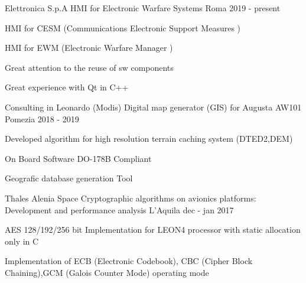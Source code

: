 


\begin{cventries}


\cventry
{Elettronica S.p.A} %
{HMI for Electronic Warfare Systems}%
{Roma} %
{2019 - present} %
{ %
	\begin{cvitems}
		\item { HMI for CESM (Communications Electronic Support Measures ) }
		\item { HMI for EWM (Electronic Warfare Manager ) }
		\item { Great attention to the reuse of sw components }
		\item { Great experience with Qt in C++ }
	\end{cvitems}
}


\cventry
{Consulting in Leonardo (Modis)} %
{Digital map generator (GIS) for Augusta AW101}%
{Pomezia} %
{2018 - 2019} %
{ %
	\begin{cvitems}
		\item { Developed algorithm for high resolution terrain caching system (DTED2,DEM)}
		\item { On Board Software DO-178B Compliant }
		\item { Geografic database generation Tool }
	\end{cvitems}
}

\cventry
{Thales Alenia Space} %
{Cryptographic algorithms on avionics platforms: Development and performance analysis}%
{L'Aquila} %
{dec - jan 2017} %
{ %
	\begin{cvitems}
		\item {AES 128/192/256 bit Implementation for LEON4 processor with static allocation only in C}
		\item {Implementation of ECB (Electronic Codebook), CBC (Cipher Block Chaining),GCM (Galois Counter Mode) operating mode}
	\end{cvitems}
}



\end{cventries}
